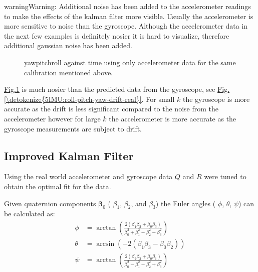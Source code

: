 \documentclass[letterpaper,10pt,english]{jupyterBook}
\begin{document}
\begin{sphinxadmonition}{warning}{Warning:}
\sphinxAtStartPar
Additional noise has been added to the accelerometer readings to make the effects of the kalman filter more visible. Usually the accelerometer is more sensitive to noise than the gyroscope. Although the accelerometer data in the next few examples is definitely nosier it is hard to visualize, therefore additional gaussian noise has been added.
\end{sphinxadmonition}

\begin{figure}[htbp]
\centering
\capstart

\noindent{}
\caption{yaw\sphinxhyphen{}pitch\sphinxhyphen{}roll against time using only accelerometer data for the same calibration mentioned above. }\label{\detokenize{5IMU:acc}}\end{figure}

\sphinxAtStartPar
\hyperref[\detokenize{5IMU:acc}]{Fig.\@ \ref{\detokenize{5IMU:acc}}} is much nosier than the predicted data from the gyroscope, see \hyperref[\detokenize{5IMU:roll-pitch-yaw-drift-real}]{Fig.\@ \ref{\detokenize{5IMU:roll-pitch-yaw-drift-real}}}. For small \(k\) the gyroscope is more accurate as the drift is less significant compared to the noise from the accelerometer however for large \(k\) the accelerometer is more accurate as the gyroscope measurements are subject to drift.


\subsection{Improved Kalman Filter}
\label{\detokenize{5IMU:improved-kalman-filter}}
\sphinxAtStartPar
Using the real world accelerometer and gyroscope data \(Q\) and \(R\) were tuned to obtain the optimal fit for the data.

\begin{sphinxShadowBox}
\sphinxstylesidebartitle{}

\sphinxAtStartPar
Given quaternion components \(\boldsymbol{\beta}_0\) ( \(\beta_1\), \(\beta_2\), and \(\beta_3\)) the Euler angles ( \(\phi\), \(\theta\), \(\psi\)) can be calculated as:
\begin{equation*}
\begin{split}\phi &= \arctan\left(\frac{2(\beta_1 \beta_2 + \beta_0 \beta_3)}{\beta_0^2 + \beta_1^2 - \beta_2^2 - \beta_3^2}\right) \\
\theta &= \arcsin\left(-2(\beta_1 \beta_3 - \beta_0 \beta_2)\right) \\
\psi &= \arctan\left(\frac{2(\beta_2 \beta_3 + \beta_0 \beta_1)}{\beta_0^2 - \beta_1^2 - \beta_2^2 + \beta_3^2}\right)\end{split}
\end{equation*}\end{sphinxShadowBox}
\end{document}
